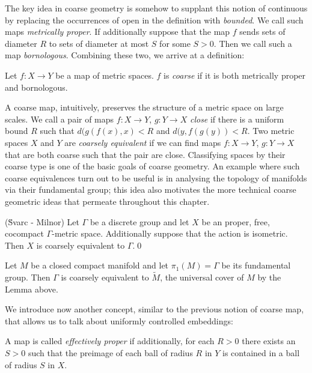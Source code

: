 The key idea in coarse geometry is somehow to supplant this notion of continuous by replacing the occurrences of open in the definition with \textit{bounded}. We call such maps \textit{metrically proper}. If additionally suppose that the map $f$ sends sets of diameter $R$ to sets of diameter at most $S$ for some $S>0$. Then we call such a map \textit{bornologous}. Combining these two, we arrive at a definition:

\begin{definition}
Let $f:X \rightarrow Y$ be a map of metric spaces. $f$ is \textit{coarse} if it is both metrically proper and bornologous.
\end{definition}

A coarse map, intuitively, preserves the structure of a metric space on large scales. We call a pair of maps $f:X\rightarrow Y$, $g:Y\rightarrow X$ \textit{close} if there is a uniform bound $R$ such that $d(g(f(x),x)<R$ and $d(y,f(g(y))<R$. Two metric spaces $X$ and $Y$ are \textit{coarsely equivalent} if we can find maps $f:X\rightarrow Y$, $g:Y\rightarrow X$ that are both coarse such that the pair are close.  Classifying spaces by their coarse type is one of the basic goals of coarse geometry. An example where such coarse equivalences turn out to be useful is in analysing the topology of manifolds via their fundamental group; this idea also motivates the more technical coarse geometric ideas that permeate throughout this chapter.

\begin{lemma}(\u{S}varc - Milnor)
Let $\Gamma$ be a discrete group and let $X$ be an proper, free, cocompact $\Gamma$-metric space. Additionally suppose that the action is isometric. Then $X$ is coarsely equivalent to $\Gamma$.\qed
\end{lemma}

\begin{example}
Let $M$ be a closed compact manifold and let $\pi_{1}(M)=\Gamma$ be its fundamental group. Then $\Gamma$ is coarsely equivalent to $\tilde{M}$, the universal cover of $M$ by the Lemma above.
\end{example}

We introduce now another concept, similar to the previous notion of coarse map, that allows us to talk about uniformly controlled embeddings:

\begin{definition}
A map is called \textit{effectively proper} if additionally, for each $R>0$ there exists an $S>0$ such that the preimage of each ball of radius $R$ in $Y$ is contained in a ball of radius $S$ in $X$.
\end{definition}

